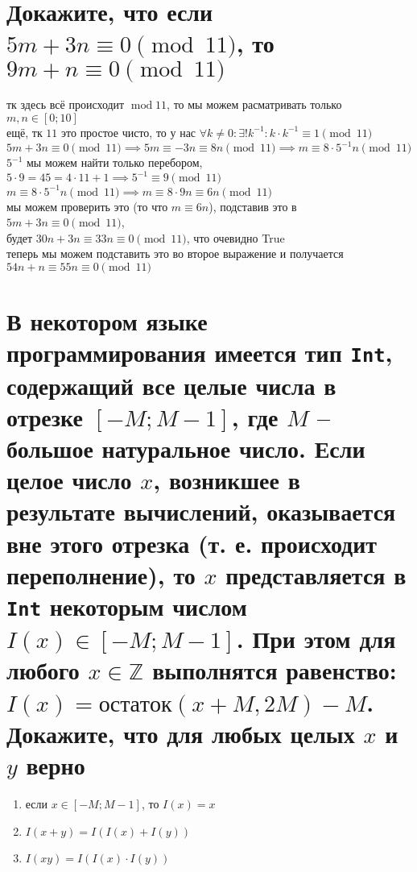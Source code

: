 \documentclass{article}
\newcommand{\ds}{\displaystyle}
\newcommand{\Mod}[1]{\pmod{#1}}
\begin{document}
  \section{Докажите, что если $5m+3n \equiv 0 \Mod{11}$, то $9m+n \equiv 0 \Mod{11}$}
  тк здесь всё происходит $\operatorname{mod}11$, то мы можем расматривать только $m,n \in [0;10]$ \\
  ещё, тк $11$ это простое чисто, то у нас $\ds \forall k \neq 0: \exists!k^{-1}: k \cdot k^{-1} \equiv 1 \Mod{11}$ \\
  $\ds 5m+3n \equiv 0 \Mod{11} \implies 5m \equiv -3n \equiv 8n \Mod{11} \implies m \equiv 8 \cdot 5^{-1}n \Mod{11}$ \\
  $5^{-1}$ мы можем найти только перебором, $5 \cdot 9 = 45 = 4 \cdot 11 + 1 \implies 5^{-1} \equiv 9 \Mod{11}$ \\
  $\ds m \equiv 8 \cdot 5^{-1}n \Mod{11} \implies m \equiv 8 \cdot 9 n \equiv 6n \Mod{11}$ \\
  мы можем проверить это (то что $m \equiv 6n$), подставив это в $5m+3n \equiv 0 \Mod{11}$, \\
  будет $30n+3n \equiv 33n \equiv 0 \Mod{11}$, что очевидно True \\
  теперь мы можем подставить это во второе выражение и получается $54n+n \equiv 55n \equiv 0 \Mod{11}$

  \section{В некотором языке программирования имеется тип \texttt{Int}, содержащий все целые числа в отрезке $[-M; M-1]$, где $M$ -- большое натуральное число. Если целое число $x$, возникшее в результате вычислений, оказывается вне этого отрезка (т. е. происходит переполнение), то $x$ представляется в \texttt{Int} некоторым числом $I(x) \in [-M; M-1]$. При этом для любого $x \in \mathbb{Z}$ выполнятся равенство: $ I(x) = остаток(x+M, 2M) - M $. Докажите, что для любых целых $x$ и $y$ верно}
  \begin{center}
    \begin{varwidth}{\textwidth}
      \begin{enumerate}
        \item если $x \in [-M; M-1]$, то $I(x) = x$
        \item $I(x+y) = I(I(x)+I(y))$
        \item $I(xy) = I(I(x) \cdot I(y))$
      \end{enumerate}
    \end{varwidth}
  \end{center}
\end{document}
